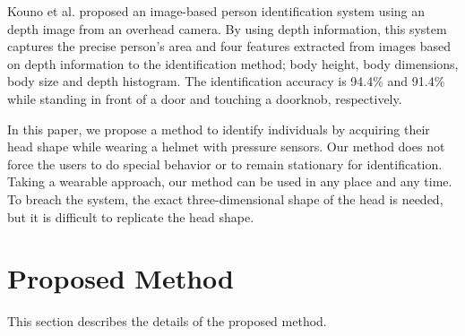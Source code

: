 \documentclass[sigchi,authordraft]{acmart}
\begin{document}
Kouno et al.\cite{head_top_camera} proposed an image-based person identification system using an depth image from an overhead camera. By using depth information, this system captures the precise person’s area and four features extracted from images based on depth information to the identification method; body height, body dimensions, body size and depth histogram. The identification accuracy is 94.4\% and 91.4\% while standing in front of a door and touching a doorknob, respectively.

In this paper, we propose a method to identify individuals by acquiring their head shape while wearing a helmet with pressure sensors. Our method does not force the users to do special behavior or to remain stationary for identification. Taking a wearable approach, our method can be used in any place and any time. To breach the system, the exact three-dimensional shape of the head is needed, but it is difficult to replicate the head shape.


\section{Proposed Method}
\label{sec:method}
This section describes the details of the proposed method.

\end{document}
